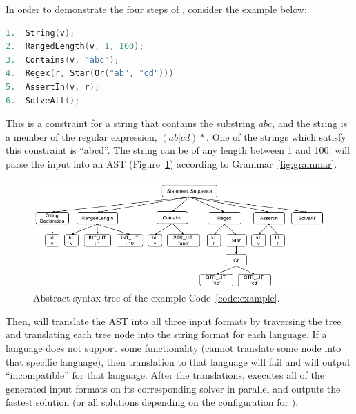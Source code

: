 In order to demonstrate the four steps of \imss, consider the example below:
\renewcommand\lstlistingname{Code}
\begin{lstlisting}[label={code:example},frame=bt,numbers=none,basicstyle=\ttfamily\small,
language=C,captionpos=b,caption={Input constraint in \imss format}]
1.  String(v);
2.  RangedLength(v, 1, 100);
3.  Contains(v, "abc");
4.  Regex(r, Star(Or("ab", "cd")))
5.  AssertIn(v, r);
6.  SolveAll();
\end{lstlisting}
This is a constraint for a string that contains the substring $abc$, and
the string is a member of the regular expression, $(ab|cd)*$.
One of the strings which satisfy this constraint is ``abcd''. The string can be of any length
between 1 and 100. \imss will parse the input into an AST (Figure~\ref{fig:exp-ast}) according to Grammar~\ref{fig:grammar}.

\begin{figure}
    \centering
    \includegraphics[scale=0.65]{example-ast}
    \caption{\label{fig:exp-ast}Abstract syntax tree of the example Code~\ref{code:example}.}
\end{figure}

Then, \imss will translate the AST into all three input formats by traversing the tree and
translating each tree node into the string format for each language. If a language does not support
some functionality (\imss cannot translate some node into that specific language),
then translation to that language will fail and \imss will output ``incompatible'' for that language. After the translations, \imss executes all of the generated input formats
on its corresponding solver in parallel and outputs the fastest solution (or all solutions depending on the configuration for \imss).
